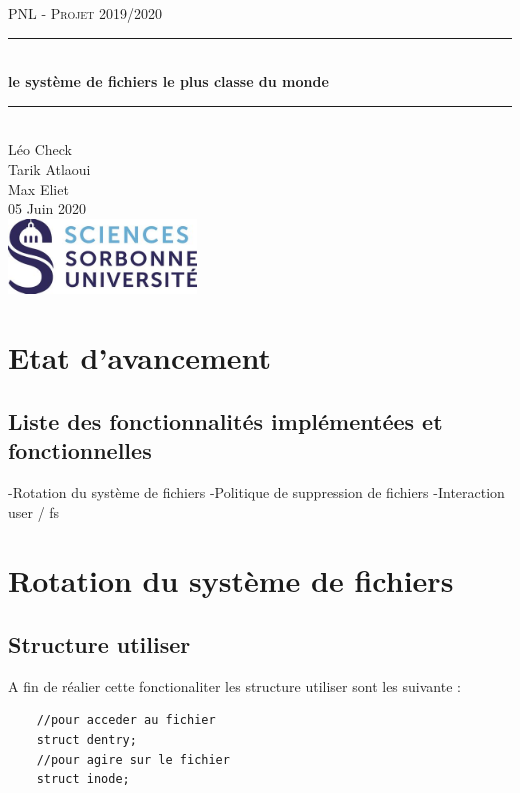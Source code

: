 \documentclass{article}
\date{\today}
\author{Léo Check\\ Tarik Atlaoui \\ Max Eliet}
\begin{document}
\begin{titlepage}
	\enlargethispage{2cm}
	\newcommand{\HRule}{\rule{\linewidth}{0.5mm}}
	\center
	\textsc{\LARGE
	PNL - Projet 2019/2020 
	} \\[1cm]
	\HRule \\[0.4cm]
	{ \huge \bfseries le système de fichiers le plus classe du monde \\[0.15cm] }
	\HRule \\[4cm]
	\large{Léo Check \\[3mm] Tarik Atlaoui \\[3mm] Max Eliet} \\[3cm]
	05 Juin 2020 \\[3cm]
	\hfill \includegraphics[width=5cm]{logoSU.jpg}
\end{titlepage}

	\newpage
	\section{Etat d'avancement}
	\subsection{Liste des fonctionnalités implémentées et fonctionnelles}
	
	-Rotation du système de fichiers
	\newline
	-Politique de suppression de fichiers
	\newline
	-Interaction user / fs

	\section{Rotation du système de fichiers}
	\subsection{Structure utiliser}
	A fin de réalier cette fonctionaliter les structure utiliser sont les suivante :
	\begin{lstlisting}
	//pour acceder au fichier 
	struct dentry;
	//pour agire sur le fichier 
	struct inode;
	\end{lstlisting}
\end{document}

